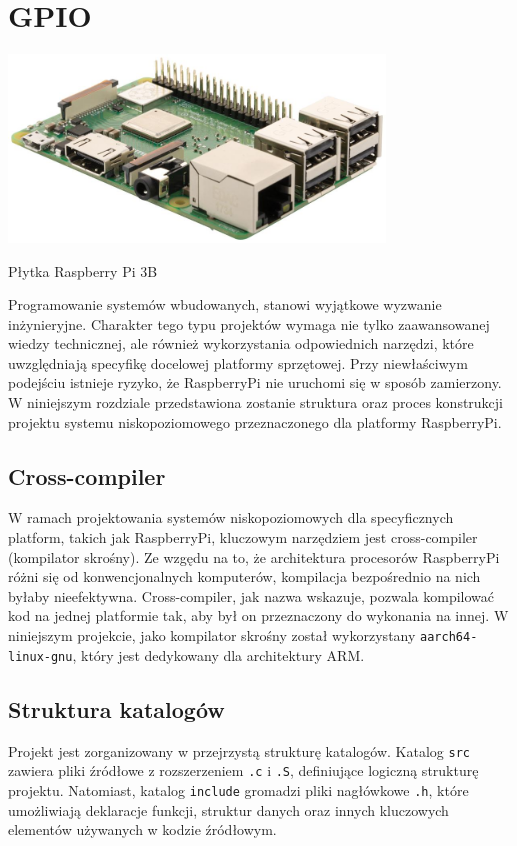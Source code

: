 \documentclass[shortabstract]{iithesis}
\begin{document}
\section{GPIO}
\begingroup
\centering
\includegraphics[width=0.75\textwidth]{rpi3b.jpg}
\captionsetup{type=figure}
\caption{Płytka Raspberry Pi 3B}
\endgroup
Programowanie systemów wbudowanych, stanowi wyjątkowe wyzwanie inżynieryjne. Charakter tego typu projektów wymaga nie tylko zaawansowanej wiedzy technicznej, ale również wykorzystania odpowiednich narzędzi, które uwzględniają specyfikę docelowej platformy sprzętowej. Przy niewłaściwym podejściu istnieje ryzyko, że RaspberryPi nie uruchomi się w sposób zamierzony. W niniejszym rozdziale przedstawiona zostanie struktura oraz proces konstrukcji projektu systemu niskopoziomowego przeznaczonego dla platformy RaspberryPi.
\subsection{Cross-compiler}
W ramach projektowania systemów niskopoziomowych dla specyficznych platform, takich jak RaspberryPi, kluczowym narzędziem jest cross-compiler (kompilator skrośny). Ze wzgędu na to, że architektura procesorów RaspberryPi różni się od konwencjonalnych komputerów, kompilacja bezpośrednio na nich byłaby nieefektywna. Cross-compiler, jak nazwa wskazuje, pozwala kompilować kod na jednej platformie tak, aby był on przeznaczony do wykonania na innej. W niniejszym projekcie, jako kompilator skrośny został wykorzystany \texttt{aarch64-linux-gnu}, który jest dedykowany dla architektury ARM.
\subsection{Struktura katalogów}
Projekt jest zorganizowany w przejrzystą strukturę katalogów. Katalog \texttt{src} zawiera pliki źródłowe z rozszerzeniem \texttt{.c} i \texttt{.S}, definiujące logiczną strukturę projektu. Natomiast, katalog \texttt{include} gromadzi pliki nagłówkowe \texttt{.h}, które umożliwiają deklaracje funkcji, struktur danych oraz innych kluczowych elementów używanych w kodzie źródłowym.
\end{document}
